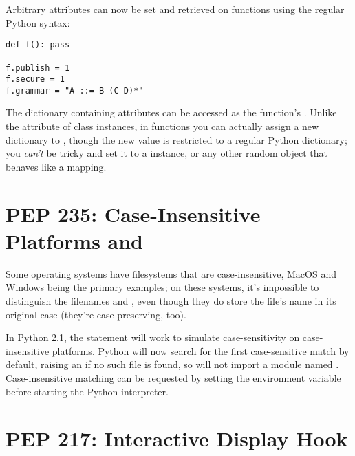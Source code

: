 \documentclass{howto}
\begin{document}
Arbitrary attributes can now be set and retrieved on functions using the
regular Python syntax:

\begin{verbatim}
def f(): pass

f.publish = 1
f.secure = 1
f.grammar = "A ::= B (C D)*"
\end{verbatim}

The dictionary containing attributes can be accessed as the function's
. Unlike the  attribute of class
instances, in functions you can actually assign a new dictionary to
, though the new value is restricted to a regular
Python dictionary; you \emph{can't} be tricky and set it to a
 instance, or any other random object that behaves
like a mapping.

\begin{seealso}


\end{seealso}



\section{PEP 235: Case-Insensitive Platforms and }

Some operating systems have filesystems that are case-insensitive,
MacOS and Windows being the primary examples; on these systems, it's
impossible to distinguish the filenames  and
, even though they do store the file's name 
in its original case (they're case-preserving, too).

In Python 2.1, the  statement will work to simulate
case-sensitivity on case-insensitive platforms.  Python will now
search for the first case-sensitive match by default, raising an
 if no such file is found, so 
will not import a module named .  Case-insensitive
matching can be requested by setting the  environment
variable before starting the Python interpreter.

\section{PEP 217: Interactive Display Hook}
\end{document}
